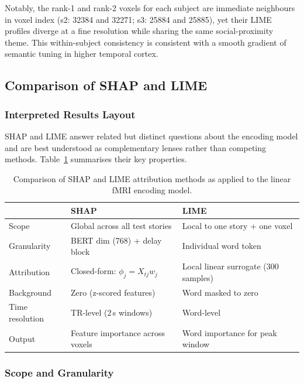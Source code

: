 \documentclass[letterpaper,11pt]{article}
\begin{document}
Notably, the rank-1 and rank-2 voxels for each subject are immediate neighbours
in voxel index (s2: 32384 and 32271; s3: 25884 and 25885), yet their LIME
profiles diverge at a fine resolution while sharing the same social-proximity
theme.  This within-subject consistency is consistent with a smooth gradient of
semantic tuning in higher temporal cortex.


\subsection{Comparison of SHAP and LIME}

\subsubsection{Interpreted Results Layout}
SHAP and LIME answer related but distinct questions about the encoding model and
are best understood as complementary lenses rather than competing methods.
Table~\ref{tab:shap_vs_lime} summarises their key properties.

\begin{table}[ht]
  \centering
  \small
  \begin{tabular}{lll}
    \toprule
    & \textbf{SHAP} & \textbf{LIME} \\
    \midrule
    Scope        & Global across all test stories & Local to one story + one voxel \\
    Granularity  & BERT dim (768) + delay block   & Individual word token \\
    Attribution  & Closed-form: $\phi_j = X_{tj} w_j$ & Local linear surrogate (300 samples) \\
    Background   & Zero (z-scored features)       & Word masked to zero \\
    Time resolution & TR-level (2\,s windows)    & Word-level \\
    Output       & Feature importance across voxels & Word importance for peak window \\
    \bottomrule
  \end{tabular}
  \caption{Comparison of SHAP and LIME attribution methods as applied to the
           linear fMRI encoding model.}
  \label{tab:shap_vs_lime}
\end{table}

\subsubsection{Scope and Granularity}
\end{document}
